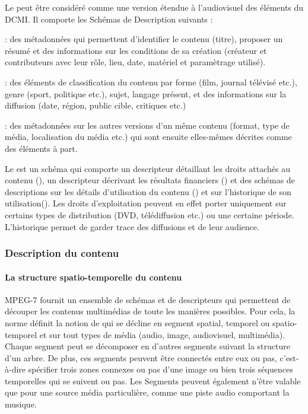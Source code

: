 Le  peut être considéré comme une version étendue à l'audiovisuel des éléments du DCMI. Il comporte les Schémas de Description suivants : 
	\begin{liste}
		\item {} : des métadonnées qui permettent d'identifier le contenu (titre), proposer un résumé et des informations sur les conditions de sa création (créateur et contributeurs avec leur rôle, lieu, date, matériel et paramètrage utilisé).

		\item {} : des éléments de classification du contenu par forme (film, journal télévisé etc.), genre (sport, politique etc.), sujet, langage présent, et des informations sur la diffusion (date, région, public cible, critiques etc.)

		\item {} : des métadonnées sur les autres versions d'un même contenu (format, type de média, localisation du média etc.) qui sont ensuite elles-mêmes décrites comme des éléments à part.
	\end{liste}

Le  est un schéma qui comporte un descripteur détaillant les droits attachés au contenu (), un descripteur décrivant les résultats financiers () et des schémas de descriptions sur les détails d'utilisation du contenu () et sur l'historique de son utilisation().
Les droits d'exploitation peuvent en effet porter uniquement sur certains types de distribution (DVD, télédiffusion etc.) ou une certaine période. 
L'historique permet de garder trace des diffusions et de leur audience.


\subsubsection{Description du contenu}
\paragraph{La structure spatio-temporelle du contenu}
MPEG-7 fournit un ensemble de schémas et de descripteurs qui permettent de découper les contenus multimédias de toute les manières possibles. 
Pour cela, la norme définit la notion de  qui se décline en segment spatial, temporel ou spatio-temporel et sur tout types de média (audio, image, audiovisuel, multimédia). 
Chaque segment peut se décomposer en d'autres segments suivant la structure d'un arbre. 
De plus, ces segments peuvent être connectés entre eux ou pas, c'est-à-dire spécifier trois zones connexes ou pas d'une image ou bien trois séquences temporelles qui se suivent ou pas. 
Les Segments peuvent également n'être valable que pour une source média particulière, comme une piste audio comportant la musique.

